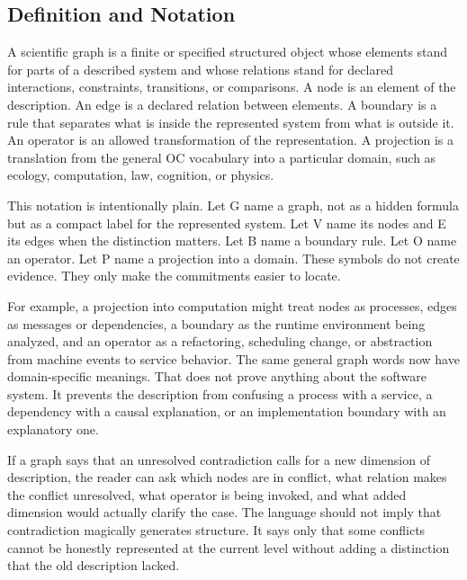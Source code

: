 \documentclass[11pt,a4paper,openany]{book}
\begin{document}
\subsection{Definition and Notation}
A scientific graph is a finite or specified structured object whose elements stand for parts of a described system and whose relations stand for declared interactions, constraints, transitions, or comparisons. A node is an element of the description. An edge is a declared relation between elements. A boundary is a rule that separates what is inside the represented system from what is outside it. An operator is an allowed transformation of the representation. A projection is a translation from the general OC vocabulary into a particular domain, such as ecology, computation, law, cognition, or physics. \cite{grimmett_percolation,goldenfeld_lectures}\par
This notation is intentionally plain. Let G name a graph, not as a hidden formula but as a compact label for the represented system. Let V name its nodes and E its edges when the distinction matters. Let B name a boundary rule. Let O name an operator. Let P name a projection into a domain. These symbols do not create evidence. They only make the commitments easier to locate.\par
For example, a projection into computation might treat nodes as processes, edges as messages or dependencies, a boundary as the runtime environment being analyzed, and an operator as a refactoring, scheduling change, or abstraction from machine events to service behavior. The same general graph words now have domain-specific meanings. That does not prove anything about the software system. It prevents the description from confusing a process with a service, a dependency with a causal explanation, or an implementation boundary with an explanatory one.\par
If a graph says that an unresolved contradiction calls for a new dimension of description, the reader can ask which nodes are in conflict, what relation makes the conflict unresolved, what operator is being invoked, and what added dimension would actually clarify the case. The language should not imply that contradiction magically generates structure. It says only that some conflicts cannot be honestly represented at the current level without adding a distinction that the old description lacked.\par
\end{document}
